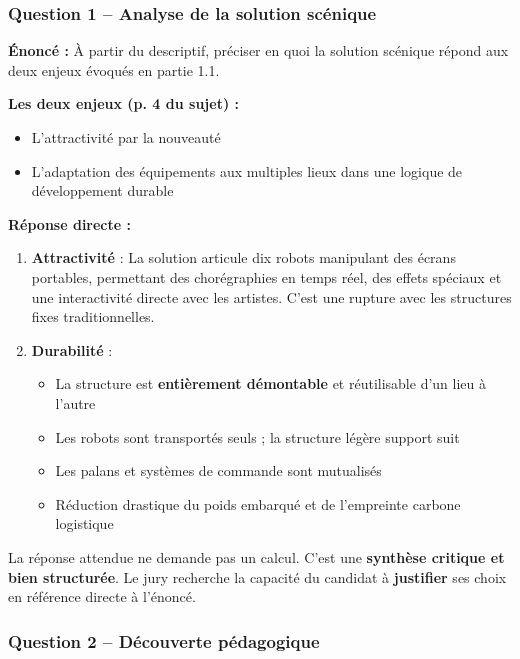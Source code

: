 \documentclass[12pt,a4paper,twoside]{article}
\begin{document}
\subsubsection{Question 1 -- Analyse de la solution scénique}

\begin{correction}
  \textbf{Énoncé :} À partir du descriptif, préciser en quoi la solution scénique répond aux deux enjeux évoqués en partie 1.1.

  \textbf{Les deux enjeux (p. 4 du sujet) :}
  \begin{itemize}
    \item L'attractivité par la nouveauté
    \item L'adaptation des équipements aux multiples lieux dans une logique de développement durable
  \end{itemize}

  \textbf{Réponse directe :}
  \begin{enumerate}
    \item \textbf{Attractivité} : La solution articule dix robots manipulant des écrans portables, permettant des chorégraphies en temps réel, des effets spéciaux et une interactivité directe avec les artistes. C'est une rupture avec les structures fixes traditionnelles.

    \item \textbf{Durabilité} :
    \begin{itemize}
      \item La structure est \textbf{entièrement démontable} et réutilisable d'un lieu à l'autre
      \item Les robots sont transportés seuls ; la structure légère support suit
      \item Les palans et systèmes de commande sont mutualisés
      \item Réduction drastique du poids embarqué et de l'empreinte carbone logistique
    \end{itemize}
  \end{enumerate}
\end{correction}

\begin{astuce}
  La réponse attendue ne demande pas un calcul. C'est une \textbf{synthèse critique et bien structurée}. Le jury recherche la capacité du candidat à \textbf{justifier} ses choix en référence directe à l'énoncé.
\end{astuce}

\subsubsection{Question 2 -- Découverte pédagogique}
\end{document}
